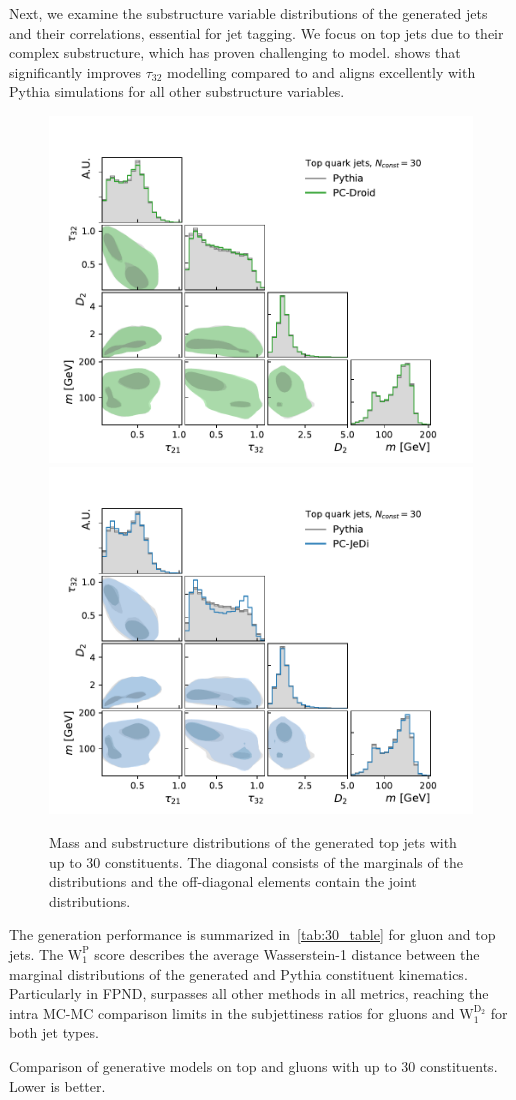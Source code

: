 Next, we examine the substructure variable distributions of the generated jets and their correlations, essential for jet tagging.
We focus on top jets due to their complex substructure, which has proven challenging to model.
 shows that \pcdroid significantly improves $\tau_{32}$ modelling compared to \pcjedi and aligns excellently with Pythia simulations for all other substructure variables.
\begin{figure}[htpb]
    \centering
    \includegraphics[width=0.49\linewidth]{Figures/jet_generation/droid/30/hlvs/t/100/hlv_corr_PC-Droid.pdf}
    \includegraphics[width=0.49\linewidth]{Figures/jet_generation/droid/30/hlvs/t/100/hlv_corr_PC-Jedi.pdf}
    \caption{
        Mass and substructure distributions of the generated top jets with up to 30 constituents.
        The diagonal consists of the marginals of the distributions and the off-diagonal elements contain the joint distributions.
    }
    \label{fig:hlvs-30}
\end{figure}

The generation performance is summarized in~\cref{tab:30_table} for gluon and top jets.
The $\mathrm{W_1^P}$ score describes the average Wasserstein-1 distance between the marginal distributions of the generated and Pythia constituent kinematics.
Particularly in FPND, \pcdroid surpasses all other methods in all metrics, reaching the intra MC-MC comparison limits in the subjettiness ratios for gluons and $\mathrm{W_1^{D_2}}$ for both jet types.

\begin{table}[tp]
    \centering
    \caption{Comparison of generative models on top and gluons with up to 30 constituents. Lower is better.}
    \label{tab:30_table}
    \resizebox{\textwidth}{!}{%
        
    }
\end{table}



